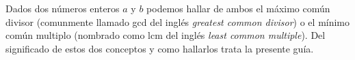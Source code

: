 Dados dos números enteros $a$ y $b$ podemos hallar de ambos el máximo común divisor (comunmente llamado gcd del inglés \emph{greatest common divisor}) o el mínimo común multiplo (nombrado como lcm del inglés \emph{least common multiple}). Del significado de estos dos conceptos y como hallarlos trata la presente guía.